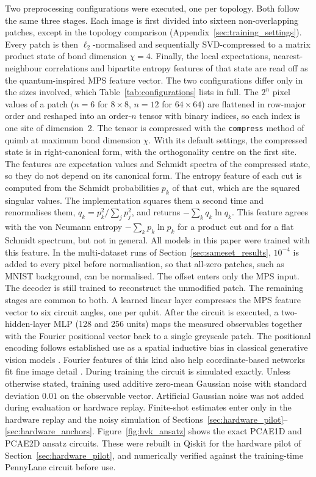 \documentclass[pdflatex,sn-basic]{sn-jnl}
\begin{document}
Two preprocessing configurations were executed, one per topology.
Both follow the same three stages.
Each image is first divided into sixteen non-overlapping patches, except in the topology comparison (Appendix~\ref{sec:training_settings}).
Every patch is then $\ell_2$-normalised and sequentially SVD-compressed to a matrix product state of bond dimension $\chi=4$.
Finally, the local expectations, nearest-neighbour correlations and bipartite entropy features of that state are read off as the quantum-inspired MPS feature vector.
The two configurations differ only in the sizes involved, which Table~\ref{tab:configurations} lists in full.
The $2^{n}$ pixel values of a patch ($n=6$ for $8\times8$, $n=12$ for $64\times64$) are flattened in row-major order and reshaped into an order-$n$ tensor with binary indices, so each index is one site of dimension~2.
The tensor is compressed with the \texttt{compress} method of quimb \citep{Gray2018} at maximum bond dimension $\chi$.
With its default settings, the compressed state is in right-canonical form, with the orthogonality centre on the first site.
The features are expectation values and Schmidt spectra of the compressed state, so they do not depend on its canonical form.
The entropy feature of each cut is computed from the Schmidt probabilities $p_k$ of that cut, which are the squared singular values.
The implementation squares them a second time and renormalises them, $q_k=p_k^2/\sum_j p_j^2$, and returns $-\sum_k q_k\ln q_k$.
This feature agrees with the von Neumann entropy $-\sum_k p_k\ln p_k$ for a product cut and for a flat Schmidt spectrum, but not in general.
All models in this paper were trained with this feature.
In the multi-dataset runs of Section~\ref{sec:sameset_results}, $10^{-4}$ is added to every pixel before normalisation, so that all-zero patches, such as MNIST background, can be normalised.
The offset enters only the MPS input.
The decoder is still trained to reconstruct the unmodified patch.
The remaining stages are common to both.
A learned linear layer compresses the MPS feature vector to six circuit angles, one per qubit.
After the circuit is executed, a two-hidden-layer MLP (128 and 256 units) maps the measured observables together with the Fourier positional vector back to a single greyscale patch.
The positional encoding follows established use as a spatial inductive bias in classical generative vision models \citep{Xu2021}.
Fourier features of this kind also help coordinate-based networks fit fine image detail \citep{Tancik2020}.
During training the circuit is simulated exactly.
Unless otherwise stated, training used additive zero-mean Gaussian noise with standard deviation $0.01$ on the observable vector.
Artificial Gaussian noise was not added during evaluation or hardware replay.
Finite-shot estimates enter only in the hardware replay and the noisy simulation of Sections~\ref{sec:hardware_pilot}--\ref{sec:hardware_anchors}.
Figure~\ref{fig:hvk_ansatz} shows the exact PCAE1D and PCAE2D ansatz circuits.
These were rebuilt in Qiskit for the hardware pilot of Section~\ref{sec:hardware_pilot}, and numerically verified against the training-time PennyLane circuit before use.
\end{document}
